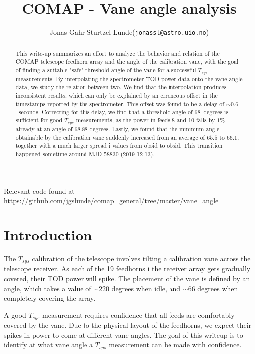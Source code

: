 \documentclass[10pt, a4paper]{article}
\begin{document}
\title{COMAP - Vane angle analysis}
\author{
    \begin{tabular}{r l}
        Jonas Gahr Sturtzel Lunde & (\texttt{jonassl@astro.uio.no})
    \end{tabular}}
\maketitle
Relevant code found at \url{https://github.com/jgslunde/comap_general/tree/master/vane_angle}
\vspace{0.7cm}


\renewcommand{\abstractname}{Summary}\begin{abstract}
    \noindent
    This write-up summarizes an effort to analyze the behavior and relation of the COMAP telescope feedhorn array and the angle of the calibration vane, with the goal of finding a suitable "safe" threshold angle of the vane for a successful $T_{sys}$ measurements. By interpolating the spectrometer TOD power data onto the vane angle data, we study the relation between two. We find that the interpolation produces inconsistent results, which can only be explained by an erroneous offset in the timestamps reported by the spectrometer. This offset was found to be a delay of $\sim 0.6$ seconds. Correcting for this delay, we find that a threshold angle of $68$ degrees is sufficient for good $T_{sys}$ measurements, as the power in feeds 8 and 10 falls by $1\%$ already at an angle of $68.88$ degrees. Lastly, we found that the minimum angle obtainable by the calibration vane suddenly increased from an average of $65.5$ to $66.1$, together with a much larger spread i values from obsid to obsid. This transition happened sometime around MJD $58830$ (2019-12-13).
\end{abstract}




\section{Introduction}
The $T_{sys}$ calibration of the telescope involves tilting a calibration vane across the telescope receiver. As each of the 19 feedhorns i the receiver array gets gradually covered, their TOD power will spike. The placement of the vane is defined by an angle, which takes a value of $\sim 220$ degrees when idle, and $\sim 66$ degrees when completely covering the array.

A good $T_{sys}$ measurement requires confidence that all feeds are comfortably covered by the vane. Due to the physical layout of the feedhorns, we expect their spikes in power to come at different vane angles. The goal of this writeup is to identify at what vane angle a $T_{sys}$ measurement can be made with confidence.
\end{document}
